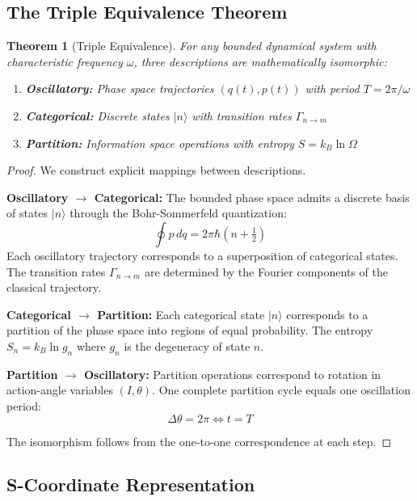 \documentclass[aps,prl,twocolumn,superscriptaddress,floatfix]{revtex4-2}
\newtheorem{theorem}{Theorem}
\begin{document}
\subsection{The Triple Equivalence Theorem}

\begin{theorem}[Triple Equivalence]
For any bounded dynamical system with characteristic frequency $\omega$, three descriptions are mathematically isomorphic:
\begin{enumerate}
\item \textbf{Oscillatory:} Phase space trajectories $(q(t), p(t))$ with period $T = 2\pi/\omega$
\item \textbf{Categorical:} Discrete states $|n\rangle$ with transition rates $\Gamma_{n \to m}$
\item \textbf{Partition:} Information space operations with entropy $S = k_B \ln \Omega$
\end{enumerate}
\end{theorem}

\begin{proof}
We construct explicit mappings between descriptions.

\textbf{Oscillatory $\to$ Categorical:} The bounded phase space admits a discrete basis of states $|n\rangle$ through the Bohr-Sommerfeld quantization:
\begin{equation}
\oint p \, dq = 2\pi\hbar (n + \tfrac{1}{2})
\end{equation}
Each oscillatory trajectory corresponds to a superposition of categorical states. The transition rates $\Gamma_{n \to m}$ are determined by the Fourier components of the classical trajectory.

\textbf{Categorical $\to$ Partition:} Each categorical state $|n\rangle$ corresponds to a partition of the phase space into regions of equal probability. The entropy $S_n = k_B \ln g_n$ where $g_n$ is the degeneracy of state $n$.

\textbf{Partition $\to$ Oscillatory:} Partition operations correspond to rotation in action-angle variables $(I, \theta)$. One complete partition cycle equals one oscillation period:
\begin{equation}
\Delta \theta = 2\pi \iff t = T
\end{equation}

The isomorphism follows from the one-to-one correspondence at each step.
\end{proof}

\subsection{S-Coordinate Representation}
\end{document}
